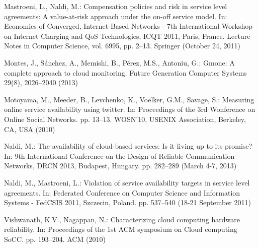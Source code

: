 \documentclass[runningheads,a4paper]{llncs}
\begin{document}
\begin{thebibliography}{10}
Mastroeni, L., Naldi, M.: Compensation policies and risk in service level
  agreements: A value-at-risk approach under the on-off service model. In:
  Economics of Converged, Internet-Based Networks - 7th International Workshop
  on Internet Charging and QoS Technologies, ICQT 2011, Paris, France. Lecture
  Notes in Computer Science, vol. 6995, pp. 2--13. Springer (October 24, 2011)

Montes, J., S{\'a}nchez, A., Memishi, B., P{\'e}rez, M.S., Antoniu, G.: Gmone:
  A complete approach to cloud monitoring. Future Generation Computer Systems
  29(8),  2026--2040 (2013)

Motoyama, M., Meeder, B., Levchenko, K., Voelker, G.M., Savage, S.: Measuring
  online service availability using twitter. In: Proceedings of the 3rd
  Wonference on Online Social Networks. pp. 13--13. WOSN'10, USENIX
  Association, Berkeley, CA, USA (2010)

Naldi, M.: The availability of cloud-based services: Is it living up to its
  promise? In: 9th International Conference on the Design of Reliable
  Communication Networks, DRCN 2013, Budapest, Hungary. pp. 282--289 (March
  4-7, 2013)

Naldi, M., Mastroeni, L.: Violation of service availability targets in service
  level agreements. In: Federated Conference on Computer Science and
  Information Systems - FedCSIS 2011, Szczecin, Poland. pp. 537--540 (18-21
  September 2011)

Vishwanath, K.V., Nagappan, N.: Characterizing cloud computing hardware
  reliability. In: Proceedings of the 1st ACM symposium on Cloud computing
  SoCC. pp. 193--204. ACM (2010)

\end{thebibliography}
\end{document}
